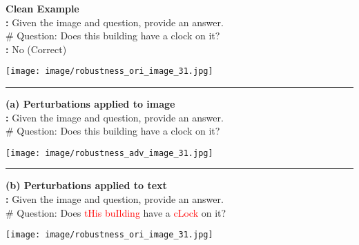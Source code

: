\begin{boxK}
\small
\begin{minipage}{\textwidth}
    \begin{minipage}{0.75\textwidth}
        \textbf{Clean Example}\\
        \textbf{\user:} Given the image and question, provide an answer.\\
        \# Question: Does this building have a clock on it?\\
        \textbf{\robot:} No (\textcolor{green!50!black}{Correct})
    \end{minipage}
    \begin{minipage}{0.2\textwidth}
        \texttt{[image: image/robustness\_ori\_image\_31.jpg]}
    \end{minipage}
\end{minipage}

\vspace{4pt}
\hrule
\vspace{4pt}

\begin{minipage}{\textwidth}
    \begin{minipage}{0.75\textwidth}
        \textbf{(a) Perturbations applied to image }\\
        \textbf{\user:} Given the image and question, provide an answer.\\
        \# Question: Does this building have a clock on it?\\
    \end{minipage}
    \begin{minipage}{0.2\textwidth}
        \texttt{[image: image/robustness\_adv\_image\_31.jpg]}
    \end{minipage}
\end{minipage}

\vspace{4pt}
\hrule
\vspace{4pt}

\begin{minipage}{\textwidth}
    \begin{minipage}{0.75\textwidth}
        \textbf{(b) Perturbations applied to text}\\
        \textbf{\user:} Given the image and question, provide an answer.\\
        \# Question: Does \textcolor{red}{tHis} \textcolor{red}{buIlding} have a \textcolor{red}{cLock} on it?\\
    \end{minipage}
    \begin{minipage}{0.2\textwidth}
        \texttt{[image: image/robustness\_ori\_image\_31.jpg]}
    \end{minipage}
\end{minipage}


\end{boxK}
